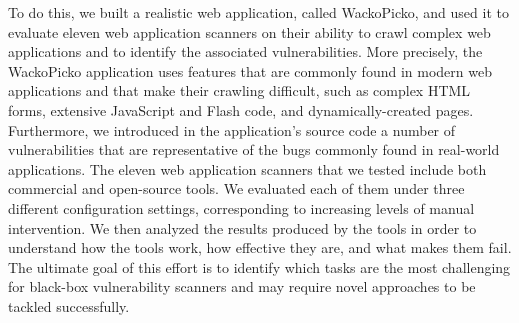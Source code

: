 

To do this, we built a realistic web application, called WackoPicko, and used it
to evaluate eleven web application scanners on their ability to crawl
complex web applications and to identify the associated vulnerabilities. 
%
More precisely, the WackoPicko application uses features that are
commonly found in modern web applications and that make their crawling
difficult, such as complex HTML forms, extensive JavaScript and Flash code,
and dynamically-created pages.
%
Furthermore, we introduced in the application's source code a number of
vulnerabilities that are representative of the bugs commonly found in
real-world applications.
%
The eleven web application scanners that we tested include both commercial
and open-source tools. We evaluated each of them under three different
configuration settings, corresponding to increasing levels of manual
intervention.
%
We then analyzed the results produced by the tools in order to
understand how the tools work, how effective they are, and what makes
them fail. The ultimate goal of this effort is to identify which tasks
are the most challenging for black-box vulnerability scanners and may
require novel approaches to be tackled successfully. 

